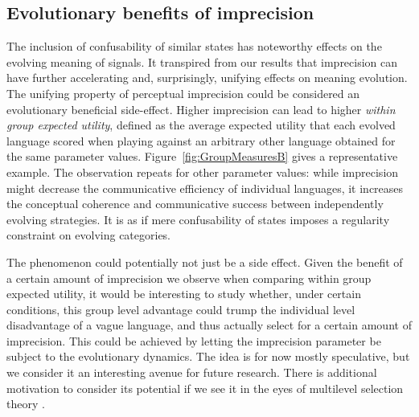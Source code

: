 \documentclass[fleqn,reqno,10pt]{article}
\begin{document}
\subsection{Evolutionary benefits of imprecision}
The inclusion of confusability of similar states has noteworthy effects on the evolving meaning of signals.
It transpired from our results that imprecision can have further accelerating and, surprisingly, unifying effects on meaning evolution.
The unifying property of perceptual imprecision could be considered an evolutionary beneficial
side-effect. Higher imprecision can lead to higher \emph{within group expected utility},
defined as the average expected utility that each evolved language scored when playing against
an arbitrary other language obtained for the same parameter
values. Figure~\ref{fig:GroupMeasuresB} gives a representative example. The observation repeats
for other parameter values: while imprecision might decrease the communicative efficiency of
individual languages, it increases the conceptual coherence and communicative success between
independently evolving strategies. It is as if mere confusability of states imposes a
regularity constraint on evolving categories.

The phenomenon could potentially not just be a side effect.
Given the benefit of a certain amount of imprecision we observe when comparing within group expected utility, it would be interesting to study whether, under certain conditions, this group level advantage could trump the individual level disadvantage of a vague language, and thus actually select for a certain amount of imprecision.
This could be achieved by letting the imprecision parameter be subject to the evolutionary dynamics.
The idea is for now mostly speculative, but we consider it an interesting avenue for future research.
There is additional motivation to consider its potential if we see it in the eyes of multilevel selection theory \citep{Wilson1994,OGorman2008}.
\end{document}
